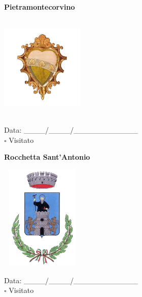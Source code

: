\documentclass[a5paper,12pt]{article}
\begin{document}
\newpage

\noindent
\begin{minipage}[t]{0.45\textwidth}
    \begin{center}
        \textbf{Pietramontecorvino}
    \end{center}
    \vspace{-0.5cm} %
    \begin{center}
        \includegraphics[height= 5cm, width=4cm]{Puglia/Stemma Pietramontecorvino.png}
    \end{center}
    \vspace{-0.4cm} %
    \begin{flushleft}
        Data: \_\_\_\_/\_\_\_\_/\_\_\_\_\_\_\_\_\_\_\_\_ \\
        $\square$ Visitato
    \end{flushleft}
\end{minipage}
\hfill
\noindent
\begin{minipage}[t]{0.45\textwidth}
    \begin{center}
        \textbf{Rocchetta Sant'Antonio}
    \end{center}
    \vspace{-0.5cm} %
    \begin{center}
        \includegraphics[height= 5cm, width=4cm]{Puglia/Stemma Rocchetta Sant'Antonio.png}
    \end{center}
    \vspace{-0.4cm} %
    \begin{flushleft}
        Data: \_\_\_\_/\_\_\_\_/\_\_\_\_\_\_\_\_\_\_\_\_ \\
        $\square$ Visitato
    \end{flushleft}
\end{minipage}
\end{document}
